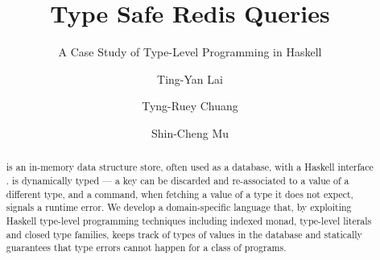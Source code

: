 \documentclass{llncs}
\begin{document}
\title{Type Safe Redis Queries}
\subtitle{A Case Study of Type-Level Programming in Haskell}
\author{Ting-Yan Lai \and Tyng-Ruey Chuang 
  \and Shin-Cheng Mu }

\maketitle

\begin{abstract}
\Redis{} is an in-memory data structure store, often used as a database, with a
Haskell interface \Hedis{}. \Redis{} is dynamically typed --- a key can be
discarded and re-associated to a value of a different type, and a command,
when fetching a value of a type it does not expect, signals a runtime error. We
develop a domain-specific language that, by exploiting Haskell type-level
programming techniques including indexed monad, type-level literals and closed
type families, keeps track of types of values in the database and statically
guarantees that type errors cannot happen for a class of \Redis{} programs.
\end{abstract}










\end{document}
